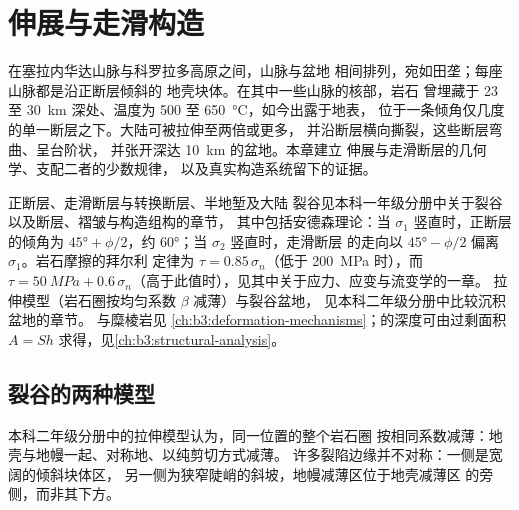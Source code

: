 \chapter{伸展与走滑构造}\label{ch:b3:extension-strike-slip}

在塞拉内华达山脉与科罗拉多高原之间，山脉与盆地
相间排列，宛如田垄；每座山脉都是沿正断层倾斜的
地壳块体。在其中一些山脉的核部，岩石
曾埋藏于 23 至 \qty{30}{km} 深处、温度为 500 至 \qty{650}{\celsius}，如今出露于地表，
位于一条倾角仅几度的单一断层之下。大陆可被拉伸至两倍或更多，
并沿断层横向撕裂，这些断层弯曲、呈台阶状，
并张开深达 \qty{10}{km} 的盆地。本章建立
伸展与走滑断层的几何学、支配二者的少数规律，
以及真实构造系统留下的证据。

\begin{recall}
正断层、走滑断层与转换断层、半地堑及大陆
裂谷见本科一年级分册中关于裂谷以及断层、褶皱与构造组构的章节，
其中包括安德森理论：当 $\sigma_1$ 竖直时，正断层
的倾角为 $\ang{45} + \phi/2$，约 \ang{60}；当 $\sigma_2$ 竖直时，走滑断层
的走向以 $\ang{45} - \phi/2$ 偏离 $\sigma_1$。岩石摩擦的拜尔利
定律为 $\tau = 0.85\,\sigma_n$（低于 \qty{200}{MPa} 时），而 $\tau =
\qty{50}{MPa} + 0.6\,\sigma_n$（高于此值时），见其中关于应力、应变与流变学的一章。
拉伸模型（岩石圈按均匀系数 $\beta$ 减薄）与裂谷盆地，
见本科二年级分册中比较沉积盆地的章节。
与糜棱岩见
\cref{ch:b3:deformation-mechanisms}；的深度可由过剩面积
$A = Sh$ 求得，见\cref{ch:b3:structural-analysis}。
\end{recall}

\section{裂谷的两种模型}\label{sec:b3:extension-strike-slip:models}

本科二年级分册中的拉伸模型认为，同一位置的整个岩石圈
按相同系数减薄：地壳与地幔一起、对称地、以纯剪切方式减薄。
许多裂陷边缘并不对称：一侧是宽阔的倾斜块体区，
另一侧为狭窄陡峭的斜坡，地幔减薄区位于地壳减薄区
的旁侧，而非其下方。

